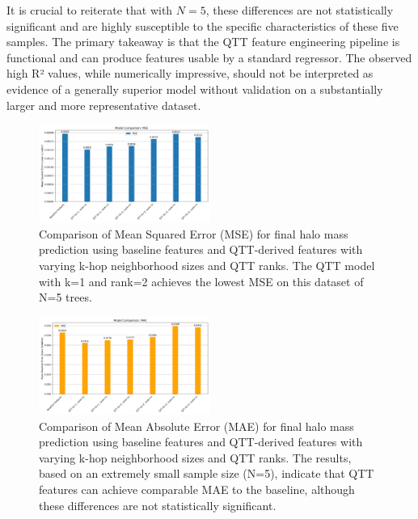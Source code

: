 \documentclass[twocolumn]{aastex631}
\begin{document}
It is crucial to reiterate that with $N=5$, these differences are not statistically significant and are highly susceptible to the specific characteristics of these five samples. The primary takeaway is that the QTT feature engineering pipeline is functional and can produce features usable by a standard regressor. The observed high R² values, while numerically impressive, should not be interpreted as evidence of a generally superior model without validation on a substantially larger and more representative dataset.

\begin{figure}[h!]
    \centering
    \includegraphics[width=0.5\textwidth]{../input_files/plots/comparison_mse_22_20250524-175150.png}
    \caption{Comparison of Mean Squared Error (MSE) for final halo mass prediction using baseline features and QTT-derived features with varying k-hop neighborhood sizes and QTT ranks. The QTT model with k=1 and rank=2 achieves the lowest MSE on this dataset of N=5 trees.
}
    \label{fig:comparison_mse}
\end{figure}

\begin{figure}[h!]
    \centering
    \includegraphics[width=0.5\textwidth]{../input_files/plots/comparison_mae_23_20250524-175150.png}
    \caption{Comparison of Mean Absolute Error (MAE) for final halo mass prediction using baseline features and QTT-derived features with varying k-hop neighborhood sizes and QTT ranks. The results, based on an extremely small sample size (N=5), indicate that QTT features can achieve comparable MAE to the baseline, although these differences are not statistically significant.
}
    \label{fig:comparison_mae}
\end{figure}
\end{document}
